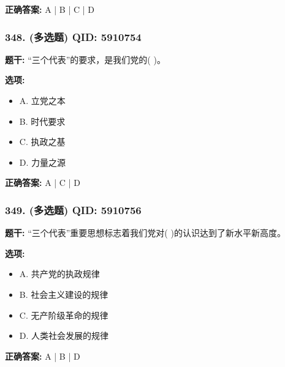 \documentclass[12pt,UTF8]{ctexart}
\begin{document}
\textbf{正确答案:}
A | B | C | D

\vspace{0.3em}\hrulefill\vspace{0.7em}

\subsubsection*{348. (多选题) \small QID: 5910754}

\textbf{题干:}
“三个代表”的要求，是我们党的( )。

\textbf{选项:}
\begin{itemize}[leftmargin=*]

  \item A. 立党之本

  \item B. 时代要求

  \item C. 执政之基

  \item D. 力量之源

\end{itemize}

\textbf{正确答案:}
A | C | D

\vspace{0.3em}\hrulefill\vspace{0.7em}

\subsubsection*{349. (多选题) \small QID: 5910756}

\textbf{题干:}
“三个代表”重要思想标志着我们党对( )的认识达到了新水平新高度。

\textbf{选项:}
\begin{itemize}[leftmargin=*]

  \item A. 共产党的执政规律

  \item B. 社会主义建设的规律

  \item C. 无产阶级革命的规律

  \item D. 人类社会发展的规律

\end{itemize}

\textbf{正确答案:}
A | B | D

\vspace{0.3em}\hrulefill\vspace{0.7em}
\end{document}

